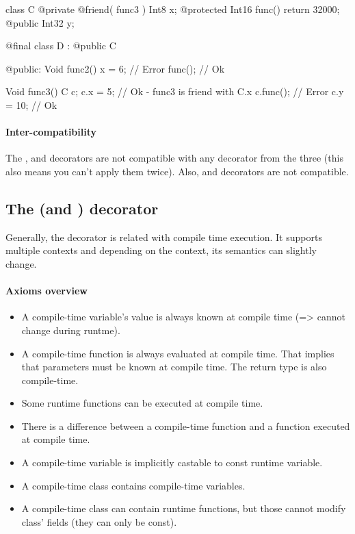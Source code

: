 \begin{code}
class C {
	@private @friend( func3 ) Int8 x;
	@protected Int16 func() {
		return 32000;
	}	
	@public Int32 y;
}

@final class D : @public C {
	
@public:
	Void func2() {
		x = 6; // Error
		func(); // Ok
	}
	
}

Void func3() {
	C c;
	c.x = 5; // Ok - func3 is friend with C.x
	c.func(); // Error
	c.y = 10; // Ok
}
\end{code}

\paragraph{Inter-compatibility}
The ,  and  decorators are not compatible with any decorator from the three (this also means you can't apply them twice). Also,  and  decorators are not compatible.

\subsection{The  (and ) decorator} \label{decorator:ctime}
Generally, the  decorator is related with compile time execution. It supports multiple contexts and depending on the context, its semantics can slightly change.

\paragraph{Axioms overview}
\begin{itemize}
	\item A compile-time variable's value is always known at compile time (=> cannot change during runtme).
	\item A compile-time function is always evaluated at compile time. That implies that parameters must be known at compile time. The return type is also compile-time.
	\item Some runtime functions can be executed at compile time.
	\item There is a difference between a compile-time function and a function executed at compile time.
	\item A compile-time variable is implicitly castable to const runtime variable.
	\item A compile-time class contains compile-time variables.
	\item A compile-time class can contain runtime functions, but those cannot modify class' fields (they can only be const).
\end{itemize}

